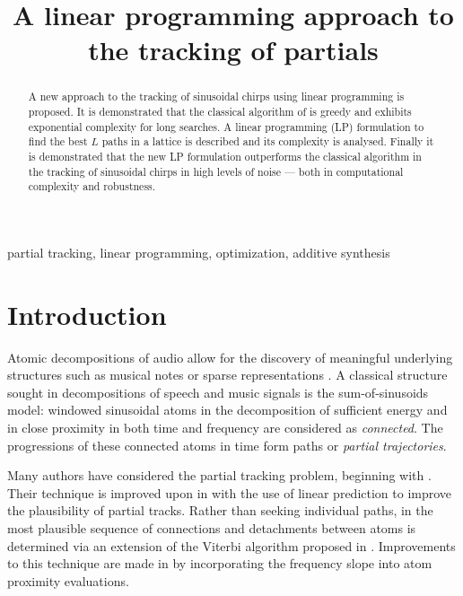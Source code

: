 \documentclass{article}
\title{A linear programming approach to the tracking of partials}
\begin{document}
\ninept
\maketitle

\begin{sloppy}

\begin{abstract}
    A new approach to the tracking of sinusoidal chirps using linear programming
    is proposed. It is demonstrated that the classical algorithm of
    \cite{mcaulay1986speech} is greedy and exhibits exponential complexity for
    long searches. A linear programming (LP) formulation to find the best $L$ paths
    in a lattice is described and its complexity is analysed. Finally it is
    demonstrated that the new LP formulation outperforms the classical algorithm
    in the tracking of sinusoidal chirps in high levels of noise --- both in
    computational complexity and robustness.
\end{abstract}

\begin{keywords}
partial tracking, linear programming, optimization, additive synthesis
\end{keywords}

\section{Introduction}

Atomic decompositions of audio allow for the discovery of meaningful underlying
structures such as musical notes \cite{gribonval2003harmonic} or sparse
representations \cite{plumbley2010sparse}. A classical structure sought in
decompositions of speech and music signals is the sum-of-sinusoids model: windowed sinusoidal atoms in the
decomposition of sufficient energy and in close proximity in both time and
frequency are considered as \textit{connected}. The progressions of these
connected atoms in time form paths or \textit{partial trajectories}.

Many authors have considered the partial tracking problem, beginning with
\cite{mcaulay1986speech}. Their technique is improved upon
in \cite{lagrange2003enhanced} with the use of linear prediction to improve the
plausibility of partial tracks. Rather than seeking individual paths, in
\cite{depalle1993tracking} the most plausible sequence of connections and
detachments between atoms is determined via an extension of the Viterbi
algorithm proposed in \cite{wolf1989finding}. Improvements to this technique are
made in \cite{kereliuk2008improved} by incorporating the frequency slope into
atom proximity evaluations.


\end{sloppy}
\end{document}
